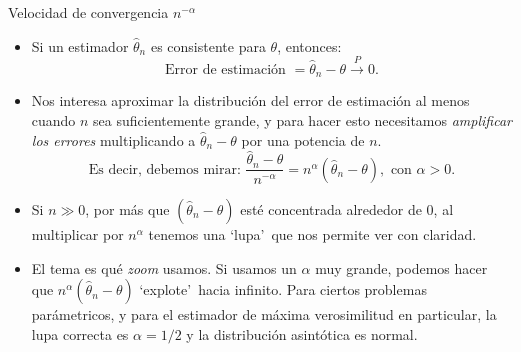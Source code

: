 \documentclass{beamer}
\theoremstyle{definition}
\newcommand{\cp}{\overset{P}{\rightarrow}}
\newcommand{\cw}{\overset{d}{\rightarrow}}
\begin{document}
\begin{frame}{\color{rosee}Velocidad de convergencia $n^{-\alpha}$}\small
\begin{itemize}
    \item  Si un estimador $\widehat{\theta}_{n}$ es consistente
  para $\theta$, entonces: 
  $$\text{Error de estimación }= 
  \widehat{\theta}_{n} - \theta \cp 0.$$
  \item Nos interesa aproximar la distribución del error de estimación al menos cuando $n$ sea suficientemente grande, y para hacer esto necesitamos \textit{amplificar los errores} multiplicando a
  $\widehat{\theta}_{n} - \theta$ por una potencia de $n$. 
  $$
\text{Es decir, debemos  mirar: } \frac{\widehat{\theta}_{n} - \theta}{n^{-\alpha}}= n^{\alpha}(\widehat{\theta}_{n} - \theta), \text{ con } 
  \alpha>0.$$
\item Si $n\gg 0$, por m\'as que
  $(\widehat{\theta}_{n} - \theta)$ est\'e concentrada alrededor de
  0, al multiplicar por $n^{\alpha}$ tenemos una `lupa'\, que nos permite
  ver con  claridad.\medskip
  
  \item El tema es qué \textit{zoom} usamos. Si usamos un
  $\alpha$ muy grande, podemos hacer que
  $n^{\alpha}(\widehat{\theta}_{n} - \theta)$ `explote'\, hacia infinito. Para ciertos problemas par\'ametricos, y para el estimador de m\'axima verosimilitud en particular, la lupa correcta es $\alpha=1/2$ y la distribuci\'on asintótica es normal. 
  \end{itemize}
\end{frame}

%   
\end{document}
